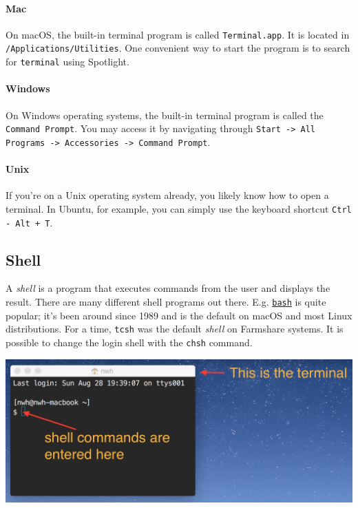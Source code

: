 \documentclass[12pt,letterpaper,twoside]{article}
\begin{document}
\paragraph{Mac}
On macOS, the built-in terminal program is called \texttt{Terminal.app}.  It is located
in \texttt{/Applications/Utilities}.  One convenient way to start the program is to
search for \texttt{terminal} using Spotlight.
\vspace{-12pt}
\paragraph{Windows} On Windows operating systems, the built-in terminal program is called the 
\texttt{Command Prompt}. You may access it by navigating through 
\texttt{Start -> All Programs -> Accessories -> Command Prompt}.
\vspace{-12pt}
\paragraph{Unix} If you're on a Unix operating system already, you likely know how to open 
a terminal. In Ubuntu, for example, you can simply use the keyboard shortcut \texttt{Ctrl - Alt + T}.

\subsection{Shell}
A \emph{shell} is a program that executes commands from the user and displays the
result.  There are many different shell programs out there.  E.g. \href{https://en.wikipedia.org/wiki/Bash_(Unix_shell)}{\texttt{bash}} is quite
popular; it's been around since 1989 and is the default on macOS and most Linux distributions.
For a time, \texttt{tcsh} was the default \emph{shell} on Farmshare systems. It is possible to change
the login shell with the \texttt{chsh} command.

\begin{center}
  \includegraphics[scale=0.3]{fig/terminal-shell}
\end{center}
\end{document}
